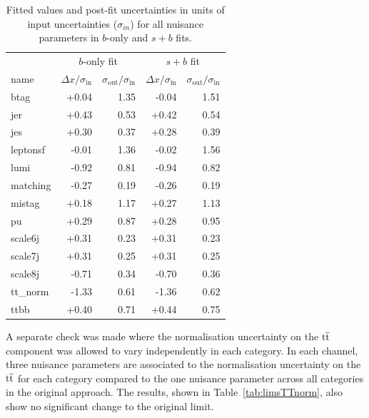 \begin{table}[ht!]
\centering
\small
\begin{tabular}{|l|r|r|r|r|} \hline 
 &  \multicolumn{2}{c|}{$b$-only fit } & \multicolumn{2}{c|}{$s+b$ fit} \\
name        &  $\Delta x/\sigma_{\text{in}}$ & $\sigma_{\text{out}}/\sigma_{\text{in}}$ & $\Delta x/\sigma_{\text{in}}$ &$\sigma_{\text{out}}/\sigma_{\text{in}}$  \\  \hline
btag          &    +0.04& 1.35 & -0.04& 1.51 \\
jer             &      +0.43& 0.53 &     +0.42& 0.54 \\
jes            &   +0.30& 0.37 &  +0.28& 0.39  \\
leptonsf    &      -0.01& 1.36 &  -0.02& 1.56 \\
lumi          &      -0.92& 0.81 &     -0.94& 0.82  \\
matching  &   -0.27& 0.19 &  -0.26& 0.19  \\
mistag      &      +0.18& 1.17 &     +0.27& 1.13  \\
pu            &      +0.29& 0.87 &     +0.28& 0.95  \\
scale6j     &   +0.31& 0.23 &  +0.31& 0.23  \\
scale7j     &   +0.31& 0.25 &  +0.31& 0.25  \\
scale8j     &   -0.71& 0.34 &  -0.70& 0.36  \\
tt\_norm   &      -1.33& 0.61 &     -1.36& 0.62  \\
ttbb          &      +0.40& 0.71 &     +0.44& 0.75  \\
 \hline
\end{tabular}
\vspace{-0.2cm}
\caption{Fitted values and post-fit uncertainties in units of input uncertainties ($\sigma_{in}$) for all nuisance parameters in $b$-only and $s+b$ fits.}
\label{tab:ScaleParamUnc}
\end{table}

A separate check was made where the normalisation uncertainty on the $\mathrm{t}\overline{\mathrm{t}}$ component was allowed to vary independently in each  \njets category. In each channel, three nuisance parameters are associated to the normalisation uncertainty on the $\mathrm{t}\overline{\mathrm{t}}$ for each \njets category compared to the one nuisance parameter across all \njets categories in the original approach. The results, shown in Table~\ref{tab:limsTTnorm}, also show no significant change to the original limit.


